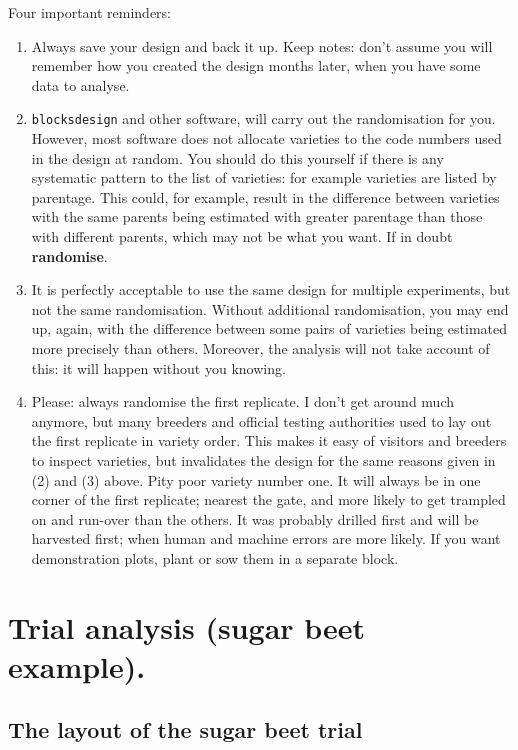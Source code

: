\documentclass[
]{book}
\begin{document}
Four important reminders:

\begin{enumerate}
\def\labelenumi{\arabic{enumi}.}
\item
  Always save your design and back it up. Keep notes: don't assume you will remember how you created the design months later, when you have some data to analyse.
\item
  \texttt{blocksdesign} and other software, will carry out the randomisation for you. However, most software does not allocate varieties to the code numbers used in the design at random. You should do this yourself if there is any systematic pattern to the list of varieties: for example varieties are listed by parentage. This could, for example, result in the difference between varieties with the same parents being estimated with greater parentage than those with different parents, which may not be what you want. If in doubt \textbf{randomise}.
\item
  It is perfectly acceptable to use the same design for multiple experiments, but not the same randomisation. Without additional randomisation, you may end up, again, with the difference between some pairs of varieties being estimated more precisely than others. Moreover, the analysis will not take account of this: it will happen without you knowing.
\item
  Please: always randomise the first replicate. I don't get around much anymore, but many breeders and official testing authorities used to lay out the first replicate in variety order. This makes it easy of visitors and breeders to inspect varieties, but invalidates the design for the same reasons given in (2) and (3) above. Pity poor variety number one. It will always be in one corner of the first replicate; nearest the gate, and more likely to get trampled on and run-over than the others. It was probably drilled first and will be harvested first; when human and machine errors are more likely. If you want demonstration plots, plant or sow them in a separate block.
\end{enumerate}

\hypertarget{Trial-analysis}{%
\chapter{Trial analysis (sugar beet example).}\label{Trial-analysis}}

\hypertarget{the-layout-of-the-sugar-beet-trial}{%
\section{The layout of the sugar beet trial}\label{the-layout-of-the-sugar-beet-trial}}
\end{document}
